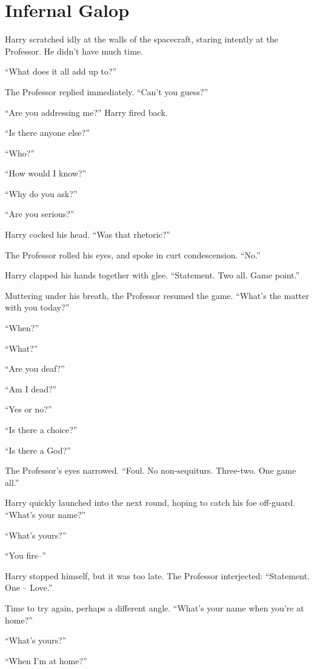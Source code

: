 \chapter{Infernal Galop}


Harry scratched idly at the walls of the spacecraft, staring intently at the Professor. He didn’t have much time.

“What does it all add up to?”

The Professor replied immediately. “Can’t you guess?”

“Are you addressing me?” Harry fired back.

“Is there anyone else?”

“Who?”

“How would I know?”

“Why do you ask?”

“Are you serious?”

Harry cocked his head. “Was that rhetoric?”

The Professor rolled his eyes, and spoke in curt condescension. “No.”

Harry clapped his hands together with glee.  “Statement.  Two all.  Game point.”

Muttering under his breath, the Professor resumed the game. “What’s the matter with you today?”

“When?”

“What?”

“Are you deaf?”

“Am I dead?”

“Yes or no?”

“Is there a choice?”

“Is there a God?”

The Professor’s eyes narrowed. “Foul. No non-sequiturs. Three-two. One game all.”

Harry quickly launched into the next round, hoping to catch his foe off-guard. “What’s your name?”

“What’s yours?”

“You firs–”

Harry stopped himself, but it was too late. The Professor interjected: “Statement.  One – Love.”

Time to try again, perhaps a different angle. “What’s your name when you’re at home?”

“What’s yours?”

“When I’m at home?”

